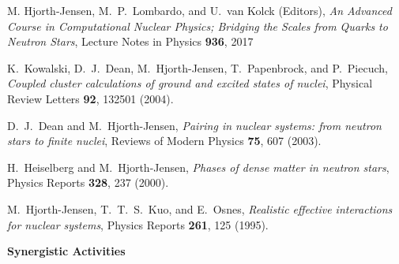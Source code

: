\begin{numberedlist}
\item M. Hjorth-Jensen, M.~P.~Lombardo, and U.~van Kolck (Editors), {\em An Advanced Course in Computational Nuclear Physics; Bridging the Scales from Quarks to Neutron Stars}, Lecture Notes in Physics {\bf 936}, 2017

\item
K.\ Kowalski, D.~J.\ Dean, M.\ Hjorth-Jensen, T.\ Papenbrock, and
  P.\ Piecuch, {\em Coupled cluster calculations of ground and excited states of nuclei}, Physical  Review Letters {\bf 92}, 132501 (2004).

\item
D.~J.\ Dean and M.\ Hjorth-Jensen, {\em Pairing in nuclear systems: from neutron stars to finite nuclei},  Reviews of Modern Physics {\bf 75}, 607 (2003).


\item
H.\ Heiselberg and M.\ Hjorth-Jensen, {\em Phases of dense matter in neutron stars}, Physics Reports {\bf 328}, 237 (2000).

\item
M.\ Hjorth-Jensen, T.~T.\ S.\ Kuo, and E.\ Osnes, {\em Realistic effective interactions for nuclear systems}, Physics Reports {\bf 261}, 125 (1995).


\end{numberedlist}


\noindent
{\bf Synergistic Activities}
\vspace*{-8pt}

